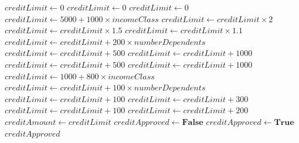 \documentclass[runningheads]{llncs}
\begin{document}
\begin{center}
\begin{algorithm}[!htb]
\label{code:credit}
\scriptsize
\begin{algorithmic}[1]
\State $creditLimit \gets 0$
    \State $creditLimit \gets 0$
\Else
        \State $creditLimit \gets 0$
        \State $creditLimit \gets 5000 + 1000 \times incomeClass$
                \State $creditLimit \gets creditLimit \times 2$
            \Else
                \State $creditLimit \gets creditLimit \times 1.5$
            \EndIf
        \Else
            \State $creditLimit \gets creditLimit \times 1.1$
        \EndIf
                \State $creditLimit \gets creditLimit + 200 \times numberDependents$
            \Else
                \State $creditLimit \gets creditLimit + 500$
            \EndIf
        \Else
            \State $creditLimit \gets creditLimit + 1000$
        \EndIf
            \State $creditLimit \gets creditLimit + 500$
        \Else
            \State $creditLimit \gets creditLimit + 1000$
        \EndIf
    \Else
        \State $creditLimit \gets 1000 + 800 \times incomeClass$
                \State $creditLimit \gets creditLimit + 100 \times numberDependents$
            \Else
                \State $creditLimit \gets creditLimit + 100$
            \EndIf
        \Else
            \State $creditLimit \gets creditLimit + 300$
        \EndIf
            \State $creditLimit \gets creditLimit + 100$
        \Else
            \State $creditLimit \gets creditLimit + 200$
        \EndIf
    \EndIf
\EndIf
\State $creditAmount \gets creditLimit$
    \State $creditApproved \gets \textbf{False}$
\Else
    \State $creditApproved \gets \textbf{True}$
\EndIf
\State \Return $creditApproved$
\end{algorithmic}
\end{algorithm}
\end{center}
\end{document}
